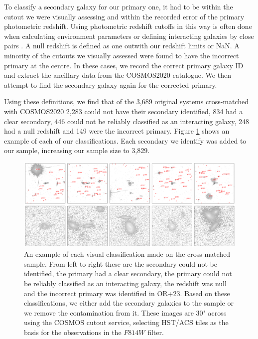 To classify a secondary galaxy for our primary one, it had to be within the cutout we were visually assessing and within the recorded error of the primary photometric redshift. Using photometric redshift cutoffs in this way is often done when calculating environment parameters \citep[e.g][]{2006MNRAS.373..469B} or defining interacting galaxies by close pairs \citep[e.g][]{2022ApJ...940....4S}. A null redshift is defined as one outwith our redshift limits or NaN. A minority of the cutouts we visually assessed were found to have the incorrect primary at the centre. In these cases, we record the correct primary galaxy ID and extract the ancillary data from the COSMOS2020 catalogue. We then attempt to find the secondary galaxy again for the corrected primary.

Using these definitions, we find that of the 3,689 original systems cross-matched with COSMOS2020 2,283 could not have their secondary identified, 834 had a clear secondary, 446 could not be reliably classified as an interacting galaxy, 248 had a null redshift and 149 were the incorrect primary. Figure \ref{fig:secondary_selection} shows an example of each of our classifications. Each secondary we identify was added to our sample, increasing our sample size to 3,829.

\begin{figure}
    \centering
    \includegraphics[width=\textwidth]{Chapter3/figures/cutouts_ex.pdf}
    \caption{An example of each visual classification made on the cross matched sample. From left to right these are the secondary could not be identified, the primary had a clear secondary, the primary could not be reliably classified as an interacting galaxy, the redshift was null and the incorrect primary was identified in OR+23. Based on these classifications, we either add the secondary galaxies to the sample or we remove the contamination from it. These images are 30" across using the COSMOS cutout service, selecting HST/ACS tiles as the basis for the observations in the $F814W$ filter.}
    \label{fig:secondary_selection}
\end{figure}

